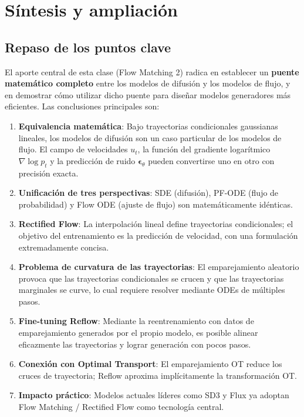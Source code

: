 \section{Síntesis y ampliación}

\subsection{Repaso de los puntos clave}

El aporte central de esta clase (Flow Matching 2) radica en establecer un \textbf{puente matemático completo} entre los modelos de difusión y los modelos de flujo, y en demostrar cómo utilizar dicho puente para diseñar modelos generadores más eficientes. Las conclusiones principales son:

\begin{enumerate}
    \item \textbf{Equivalencia matemática}: Bajo trayectorias condicionales gaussianas lineales, los modelos de difusión son un caso particular de los modelos de flujo. El campo de velocidades $u_t$, la función del gradiente logarítmico $\nabla \log p_t$ y la predicción de ruido $\boldsymbol{\epsilon}_\theta$ pueden convertirse uno en otro con precisión exacta.

    \item \textbf{Unificación de tres perspectivas}: SDE (difusión), PF-ODE (flujo de probabilidad) y Flow ODE (ajuste de flujo) son matemáticamente idénticas.

    \item \textbf{Rectified Flow}: La interpolación lineal define trayectorias condicionales; el objetivo del entrenamiento es la predicción de velocidad, con una formulación extremadamente concisa.

    \item \textbf{Problema de curvatura de las trayectorias}: El emparejamiento aleatorio provoca que las trayectorias condicionales se crucen y que las trayectorias marginales se curve, lo cual requiere resolver mediante ODEs de múltiples pasos.

    \item \textbf{Fine-tuning Reflow}: Mediante la reentrenamiento con datos de emparejamiento generados por el propio modelo, es posible alinear eficazmente las trayectorias y lograr generación con pocos pasos.

    \item \textbf{Conexión con Optimal Transport}: El emparejamiento OT reduce los cruces de trayectoria; Reflow aproxima implícitamente la transformación OT.

    \item \textbf{Impacto práctico}: Modelos actuales líderes como SD3 y Flux ya adoptan Flow Matching / Rectified Flow como tecnología central.
\end{enumerate}

